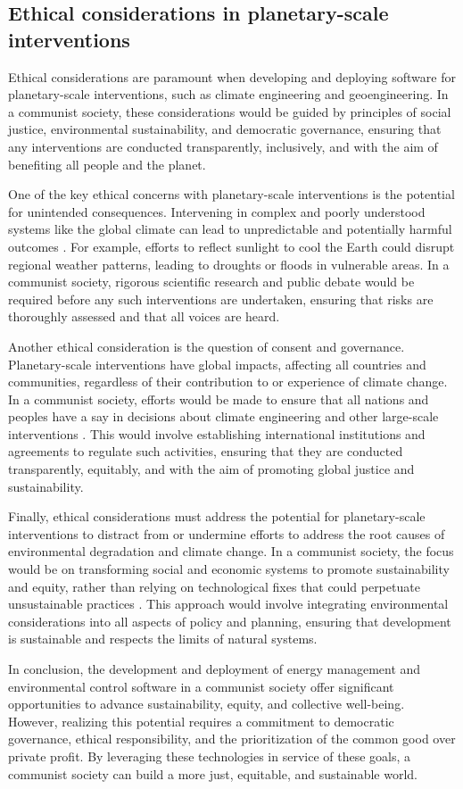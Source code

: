 \subsection{Ethical considerations in planetary-scale interventions}

Ethical considerations are paramount when developing and deploying software for planetary-scale interventions, such as climate engineering and geoengineering. In a communist society, these considerations would be guided by principles of social justice, environmental sustainability, and democratic governance, ensuring that any interventions are conducted transparently, inclusively, and with the aim of benefiting all people and the planet.

One of the key ethical concerns with planetary-scale interventions is the potential for unintended consequences. Intervening in complex and poorly understood systems like the global climate can lead to unpredictable and potentially harmful outcomes \cite[pp.~410-420]{gardiner2011perfect}. For example, efforts to reflect sunlight to cool the Earth could disrupt regional weather patterns, leading to droughts or floods in vulnerable areas. In a communist society, rigorous scientific research and public debate would be required before any such interventions are undertaken, ensuring that risks are thoroughly assessed and that all voices are heard.

Another ethical consideration is the question of consent and governance. Planetary-scale interventions have global impacts, affecting all countries and communities, regardless of their contribution to or experience of climate change. In a communist society, efforts would be made to ensure that all nations and peoples have a say in decisions about climate engineering and other large-scale interventions \cite[pp.~55-63]{crutzen2006geoengineering}. This would involve establishing international institutions and agreements to regulate such activities, ensuring that they are conducted transparently, equitably, and with the aim of promoting global justice and sustainability.

Finally, ethical considerations must address the potential for planetary-scale interventions to distract from or undermine efforts to address the root causes of environmental degradation and climate change. In a communist society, the focus would be on transforming social and economic systems to promote sustainability and equity, rather than relying on technological fixes that could perpetuate unsustainable practices \cite[pp.~245-252]{shepherd2009geoengineering}. This approach would involve integrating environmental considerations into all aspects of policy and planning, ensuring that development is sustainable and respects the limits of natural systems.

In conclusion, the development and deployment of energy management and environmental control software in a communist society offer significant opportunities to advance sustainability, equity, and collective well-being. However, realizing this potential requires a commitment to democratic governance, ethical responsibility, and the prioritization of the common good over private profit. By leveraging these technologies in service of these goals, a communist society can build a more just, equitable, and sustainable world.